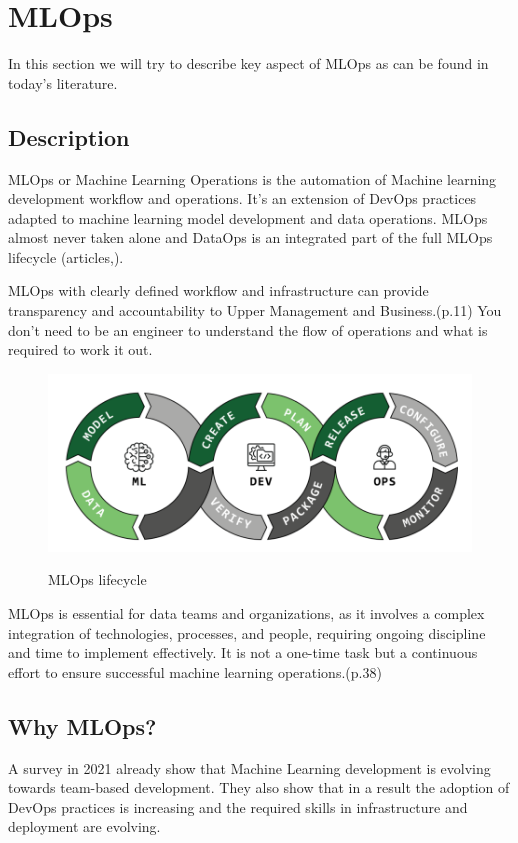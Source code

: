 \section{MLOps}\label{sec:mlops}

In this section we will try to describe key aspect of MLOps as can be found in today's literature.

\subsection{Description}\label{subsec:description}
MLOps or Machine Learning Operations is the automation of Machine learning development workflow and operations.
It's an extension of DevOps practices adapted to machine learning model development and data operations.
MLOps almost never taken alone and DataOps is an integrated part of the full MLOps lifecycle (articles,).

MLOps with clearly defined workflow and infrastructure can provide transparency and accountability to Upper Management and Business.\cite{treveil2020introducing}(p.11)
You don't need to be an engineer to understand the flow of operations and what is required to work it out.

\begin{figure}[!htbp]
    \caption{MLOps lifecycle\cite{mlops-definition-tools-and-challenge}}
    \centering
    \includegraphics[scale=0.5]{images/ml-dev-ops}
    \label{fig:ml-dev-ops}
\end{figure}

MLOps is essential for data teams and organizations, as it involves a complex integration of technologies, processes, and people, requiring ongoing discipline and time to implement effectively.
It is not a one-time task but a continuous effort to ensure successful machine learning operations.\cite{treveil2020introducing}(p.38)


\subsection{Why MLOps?}\label{subsec:why-mlops?}
A survey in 2021\cite{DBLP:journals/corr/abs-2103-08942} already show that Machine Learning development is evolving towards team-based development.
They also show that in a result the adoption of DevOps practices is increasing and the required skills in infrastructure and deployment are evolving.

